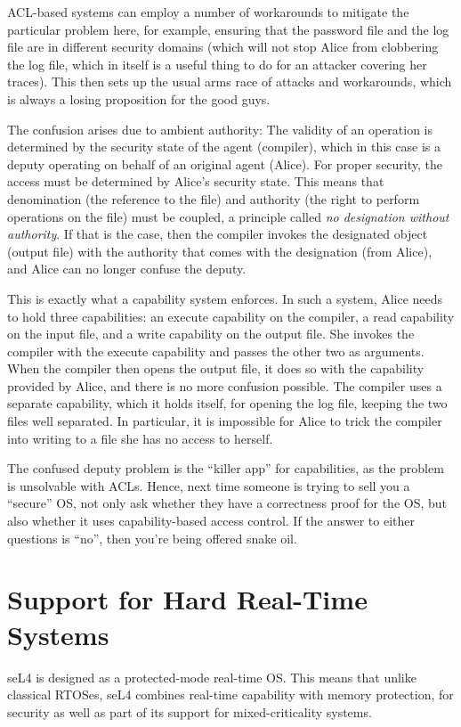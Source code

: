\documentclass[english,a4paper,12pt\ifDraft,draft\fi]{report}
\newcommand{\Sect}[1]{\section{#1}}
\newcommand{\Sect}[1]{\chapter{#1}}
\begin{document}
  ACL-based systems can employ a number of workarounds to mitigate the
  particular problem here, for example, ensuring that the password
  file and the log file are in different security domains (which will
  not stop Alice from clobbering the log file, which in itself is a
  useful thing to do for an attacker covering her traces). This then
  sets up the usual arms race of attacks and workarounds, which is
  always a losing proposition for the good guys.

  The confusion arises due to ambient authority: The validity of
  an operation is determined by the security state of the agent
  (compiler), which in this case is a deputy operating on behalf of an
  original agent (Alice). For proper security, the access must be
  determined by Alice's security state. This means that denomination
  (the reference to the file) and authority (the right to perform
  operations on the file) must be coupled, a principle called \emph{no
    designation without authority}. If that is the case, then the
  compiler invokes the designated object (output file) with the
  authority that comes with the designation (from Alice), and Alice
  can no longer confuse the deputy.

  This is exactly what a capability system enforces. In such a system,
  Alice needs to hold three capabilities: an execute capability on the
  compiler, a read capability on the input file, and a write
  capability on the output file. She invokes the compiler with the
  execute capability and passes the other two as arguments. When the
  compiler then opens the output file, it does so with the capability
  provided by Alice, and there is no more confusion possible. The
  compiler uses a separate capability, which it holds itself, for
  opening the log file, keeping the two files well separated. In
  particular, it is impossible for Alice to trick the compiler into
  writing to a file she has no access to herself.

  The confused deputy problem is the ``killer app'' for capabilities,
  as the problem is unsolvable with ACLs. Hence, next time someone is
  trying to sell you a ``secure'' OS, not only ask whether they have
  a correctness proof for the OS, but also whether it uses
  capability-based access control. If the answer to either questions
  is ``no'', then you're being offered snake oil.

  \Sect{Support for Hard Real-Time Systems}\label{s:rtos}

  seL4 is designed as a protected-mode real-time OS. This means that
  unlike classical RTOSes, seL4 combines real-time capability with
  memory protection, for security as well as part of its support for
  mixed-criticality systems.
\end{document}
